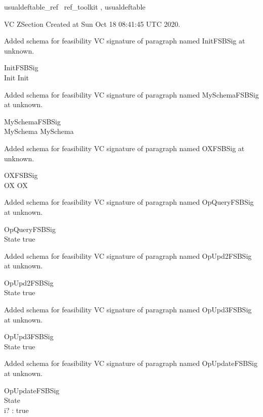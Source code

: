 \documentclass{article}
\begin{document}

\begin{zsection}	 \SECTION usualdeftable\_ref \parents~ref\_toolkit , usualdeftable
\end{zsection}

VC ZSection Created at Sun Oct 18 08:41:45 UTC 2020.


Added schema for feasibility VC signature of paragraph named InitFSBSig at unknown.
\begin{schema}{InitFSBSig}
\\
 Init 
\where
 Init
\end{schema}


Added schema for feasibility VC signature of paragraph named MySchemaFSBSig at unknown.
\begin{schema}{MySchemaFSBSig}
\\
 MySchema 
\where
 MySchema
\end{schema}


Added schema for feasibility VC signature of paragraph named OXFSBSig at unknown.
\begin{schema}{OXFSBSig}
\\
 OX 
\where
 OX
\end{schema}


Added schema for feasibility VC signature of paragraph named OpQueryFSBSig at unknown.
\begin{schema}{OpQueryFSBSig}
\\
 State 
\where
 true
\end{schema}


Added schema for feasibility VC signature of paragraph named OpUpd2FSBSig at unknown.
\begin{schema}{OpUpd2FSBSig}
\\
 State 
\where
 true
\end{schema}


Added schema for feasibility VC signature of paragraph named OpUpd3FSBSig at unknown.
\begin{schema}{OpUpd3FSBSig}
\\
 State 
\where
 true
\end{schema}


Added schema for feasibility VC signature of paragraph named OpUpdateFSBSig at unknown.
\begin{schema}{OpUpdateFSBSig}
\\
 State \\
 i? : \nat 
\where
 true
\end{schema}
\end{document}
